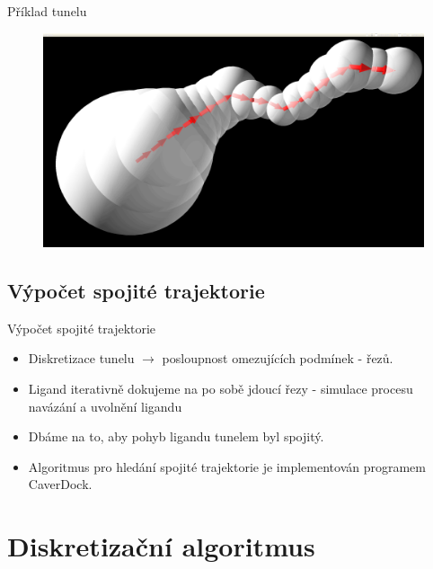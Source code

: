 \documentclass{beamer}
\begin{document}
\begin{frame}{Příklad tunelu}
    \begin{figure}
        \includegraphics[width=\textwidth]{img/basic_tunnel.jpg}
    \end{figure}
\end{frame}

\subsection{Výpočet spojité trajektorie}
\begin{frame}{Výpočet spojité trajektorie}
  \begin{itemize}
  \item Diskretizace tunelu $\rightarrow$ posloupnost omezujících podmínek - řezů.
 	\item Ligand iterativně dokujeme na po sobě jdoucí řezy - simulace procesu navázání a uvolnění ligandu
 	\item Dbáme na to, aby pohyb ligandu tunelem byl spojitý.
 	\item Algoritmus pro hledání spojité trajektorie je implementován programem CaverDock.
  \end{itemize}
\end{frame}

\section{Diskretizační algoritmus}
\end{document}
